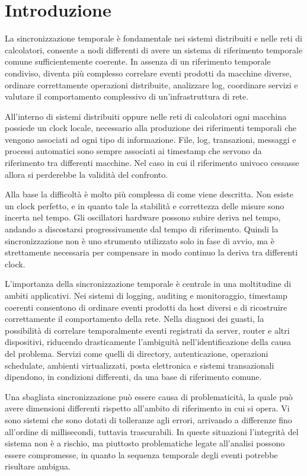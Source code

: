\chapter{Introduzione}
\label{cha:Introduzione}

La sincronizzazione temporale è fondamentale nei sistemi distribuiti e nelle
reti di calcolatori, consente a nodi differenti di avere un sistema di riferimento
temporale comune sufficientemente coerente. In assenza di un riferimento
temporale condiviso, diventa più complesso correlare eventi prodotti da macchine diverse,
ordinare correttamente operazioni distribuite, analizzare log, coordinare
servizi e valutare il comportamento complessivo di un'infrastruttura di rete.

All'interno di sistemi distribuiti oppure nelle reti di calcolatori ogni macchina possiede
un clock locale, necessario alla produzione dei riferimenti temporali che vengono associati 
ad ogni tipo di informazione. File, log, transazioni, messaggi e processi automatici sono 
sempre associati ai timestamp che servono da riferimento tra differenti macchine.
Nel caso in cui il riferimento univoco cessasse allora si perderebbe la validità del 
confronto.

Alla base la difficoltà è molto più complessa di come viene descritta. Non esiste 
un clock perfetto, e in quanto tale la stabilità e correttezza delle misure sono incerta
nel tempo. Gli oscillatori hardware possono subire deriva nel tempo, andando a discostarsi
progressivamente dal tempo di riferimento. Quindi la sincronizzazione non è uno strumento utilizzato
solo in fase di avvio, ma è strettamente necessaria per compensare in modo continuo la deriva
tra differenti clock.

L'importanza della sincronizzazione temporale è centrale in una moltitudine di
ambiti applicativi. Nei sistemi di logging, auditing e monitoraggio, timestamp coerenti
consentono di ordinare eventi prodotti da host diversi e di ricostruire correttamente
il comportamento della rete. Nella diagnosi dei guasti, la possibilità di correlare
temporalmente eventi registrati da server, router e altri dispositivi, riducendo
drasticamente l'ambiguità nell'identificazione della causa del problema. Servizi come
quelli di directory, autenticazione, operazioni schedulate, ambienti
virtualizzati, posta elettronica e sistemi transazionali dipendono, in
condizioni differenti, da una base di riferimento comune.

Una sbagliata sincronizzazione può essere causa di problematicità, la quale può
avere dimensioni differenti rispetto all'ambito di riferimento in cui si opera. Vi
sono sistemi che sono dotati di tolleranze agli errori, arrivando a
differenze fino all'ordine di millisecondi, tuttavia trascurabili. 
In queste situazioni l'integrità del sistema non è a rischio, ma piuttosto problematiche
legate all'analisi possono essere compromesse, in quanto la sequenza temporale
degli eventi potrebbe risultare ambigua.

